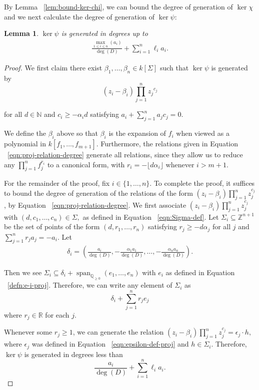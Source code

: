 \documentclass{amsart}
\theoremstyle{plain}
\newtheorem{lem}[thm]{Lemma}
\theoremstyle{definition}
\theoremstyle{remark}
\numberwithin{equation}{section}
\newcommand\bq{{\mathbb Q}}
\newcommand\bida{a}
\DeclareMathOperator{\newspan}{span}
\begin{document}
By Lemma ~\ref{lem:bound-ker-chi}, we can bound the degree of generation of
$\ker \chi $ and we next calculate the degree of generation of $\ker \psi$:

\begin{lem}
\label{lem:proj-relations-psi}
$\ker \psi$ is generated in degrees up to
\begin{align}
\label{eqn:proj-relation-degree}
	\frac{\max_{1\le i \le n}(\bida_i)}{\deg(D)} +  \sum_{i=1}^n \ell_i a_i.
\end{align}

\end{lem}

\begin{proof}
We first claim there exist $\beta_1, \ldots, \beta_n \in k[\Sigma]$
such that $\ker \psi$ is generated by
\begin{equation}
\label{eqn:relations-psi-proj}
	(z_i - \beta_i)\prod_{j=1}^n {z_j}^{c_{j}}
\end{equation}

\noindent
for all $d \in \mathbb{N}$ and $c_i \ge -\alpha_i d$ satisfying
$\bida_i + \sum_{j = 1}^n \bida_j c_j = 0$.

We define the $\beta_i$ above so that $\beta_i$ is the expansion of
$f_i$ when viewed as a polynomial in $k[f_1,\ldots, f_{m + 1}]$.
Furthermore, the relations given in Equation
~\eqref{eqn:proj-relation-degree} generate all relations, since they
allow us to reduce any $ \prod_{j = 1}^n f_j^{r_i}$ to a canonical
form, with $r_i = -\lfloor  d \alpha_i\rfloor$ whenever $i  > m + 1$.

For the remainder of the proof, fix $i \in \{1,\ldots, n\}$. To
complete the proof, it suffices to bound the degree of generation
of the relations of the form $(z_i - \beta_i) \prod_{j = 1}^n
z_j^{c_j}$, by Equation ~\eqref{eqn:proj-relation-degree}. We first
associate $(z_i - \beta_i)\prod_{j=1}^n z_j^{c_j}$ with $(d, c_1,
\ldots, c_n) \in \Sigma,$ as defined in Equation
~\eqref{eqn:Sigma-def}. Let $\Sigma_i \subseteq \mathbb{Z}^{n + 1}$
be the set of points of the form $(d, r_1, \ldots, r_n)$ satisfying
$r_j \ge -d \alpha_j$ for all $j$ and $\sum_{j=1}^n r_j a_j = -a_i$.
Let
\begin{align*}
	\delta_i = \left(\frac{a_i}{\deg(D)}, -\frac{\alpha_1 a_1}{\deg(D)},
	\ldots, - \frac{\alpha_n a_n}{\deg(D)} \right).
\end{align*}

\noindent
Then we see $\Sigma_i \subseteq \delta_i + \newspan_{\bq_{\geq 0}}
(e_1, \ldots, e_n)$ with $e_i$ as defined in Equation
~\ref{defn:e-i-proj}. Therefore, we can write any element of
$\Sigma_i$ as
\[
	\delta_i + \sum_{j=1}^n r_j e_j
\]
where $r_j \in \mathbb{R}$ for each $j$.

Whenever some $r_j \ge 1$, we can generate the relation $(z_i -
\beta_i)\prod_{j=1}^n z_j^{c_j} = \epsilon_j \cdot h,$ where
$\epsilon_j$ was defined in Equation ~\ref{eqn:epsilon-def-proj} and
$h \in \Sigma_i$. Therefore, $\ker \psi$ is generated in degrees
less than
\[
	\frac{\bida_i}{\deg(D)} + \sum_{i=1}^n \ell_i a_i.
\]
\end{proof}
\end{document}
